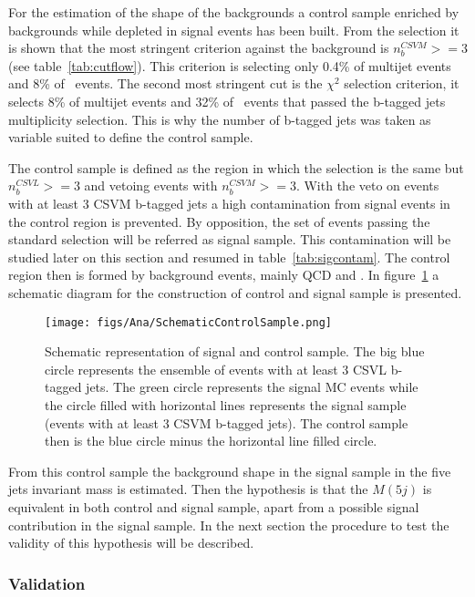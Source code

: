 For the estimation of the shape of the backgrounds a control sample enriched by backgrounds while depleted in signal events has been built. From the selection it is shown that the most stringent criterion against the background is $n_{b}^{CSVM}>=3$ (see table~\ref{tab:cutflow}). This criterion is selecting only 0.4\% of multijet events and 8\% of \ttbar~events. The second most stringent cut is the $\chi^{2}$ selection criterion, it selects 8\% of multijet events and 32\% of \ttbar~events that passed the b-tagged jets multiplicity selection. This is why the number of b-tagged jets was taken as variable suited to define the control sample. 

The control sample is defined as the region in which  the selection is the same but $n_{b}^{CSVL}>=3$ and vetoing events with $n_{b}^{CSVM}>=3$. With the veto on events with at least 3 CSVM b-tagged jets a high contamination from signal events in the control region is prevented. By opposition, the set of events passing the standard selection will be referred as signal sample.  This contamination will be studied later on this section and resumed in table~\ref{tab:sigcontam}. The control region then is formed by background events, mainly QCD and \ttbar. In figure~\ref{fig:CSSSSche} a schematic diagram for the construction of control and signal sample is presented.

\begin{figure}[!Hhtbp]
  \begin{center}
    \texttt{[image: figs/Ana/SchematicControlSample.png]}
    \caption{Schematic representation of signal and control sample. The big blue circle represents the ensemble of events with at least 3 CSVL b-tagged jets. The green circle represents the signal MC events while the circle filled with horizontal lines represents the signal sample (events with at least 3 CSVM b-tagged jets). The control sample then is the blue circle minus the horizontal line filled circle.}
    \label{fig:CSSSSche}
  \end{center}
\end{figure}

From this control sample the background shape in the signal sample in the five jets invariant mass is estimated. Then the hypothesis is that the $M(5j)$ is equivalent in both control and signal sample, apart from a possible signal contribution in the signal sample. In the next section the procedure to test the validity of this hypothesis will be described. 

\subsubsection{Validation}
\label{sec:validation}

